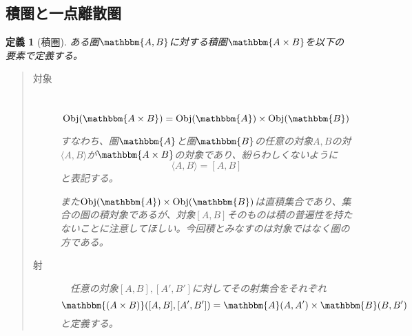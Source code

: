 \documentclass[dvipdfmx]{jsarticle}
\newcommand{\cat}[1]{\mathbbm{#1}}
\newcommand{\tuple}[1]{\langle #1\rangle}
\newcommand{\obj}[1]{\mathrm{Obj}(\cat{#1})}
\newcommand{\arset}[3]{\cat{#1}(#2,#3)}
\newcommand{\pcobj}[1]{[#1]}
\newtheorem{define}{定義}[section]
\numberwithin{proof}{subsection}
\numberwithin{prop}{subsection}
\numberwithin{define}{subsection}
\begin{document}
	\subsection{積圏と一点離散圏}
	\begin{define}[積圏]
		ある圏$\cat{A,B}$に対する積圏$\cat{A\times B}$を以下の要素で定義する。
		\begin{quote}
			\begin{description}
				\item[対象]　\[\obj{A\times B}=\obj{A}\times\obj{B}\]

				すなわち、圏$\cat{A}$と圏$\cat{B}$の任意の対象$A,B$の対$\tuple{A,B}$が$\cat{A\times B}$の対象であり、紛らわしくないように\[\tuple{A,B}=\pcobj{A,B}\]と表記する。

				また$\obj{A}\times\obj{B}$は直積集合であり、集合の圏の積対象であるが、対象$\pcobj{A,B}$そのものは積の普遍性を持たないことに注意してほしい。今回積とみなすのは対象ではなく圏の方である。
				\item[射]　任意の対象$\pcobj{A,B},\pcobj{A',B'}$に対してその射集合をそれぞれ\[\arset{(A\times B)}{\pcobj{A,B}}{\pcobj{A',B'}}=\arset{A}{A}{A'}\times\arset{B}{B}{B'}\]と定義する。


\end{description}
\end{quote}
\end{define}
\end{document}
